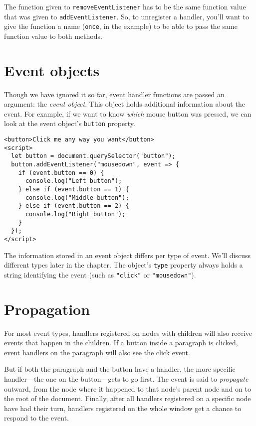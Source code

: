 The function given to \lstinline`removeEventListener` has to be the same function value that was given to \lstinline`addEventListener`. So, to unregister a handler, you'll want to give the function a name (\lstinline`once`, in the example) to be able to pass the same function value to both methods.

\section{Event objects}

Though we have ignored it so far, event handler functions are passed an argument: the \emph{event object}. This object holds additional information about the event. For example, if we want to know \emph{which} mouse button was pressed, we can look at the event object's \lstinline`button` property.

\begin{lstlisting}
<button>Click me any way you want</button>
<script>
  let button = document.querySelector("button");
  button.addEventListener("mousedown", event => {
    if (event.button == 0) {
      console.log("Left button");
    } else if (event.button == 1) {
      console.log("Middle button");
    } else if (event.button == 2) {
      console.log("Right button");
    }
  });
</script>
\end{lstlisting}
\noindent{}

The information stored in an event object differs per type of event. We'll discuss different types later in the chapter. The object's \lstinline`type` property always holds a string identifying the event (such as \lstinline`"click"` or \lstinline`"mousedown"`).

\section{Propagation}

For most event types, handlers registered on nodes with children will also receive events that happen in the children. If a button inside a paragraph is clicked, event handlers on the paragraph will also see the click event.

But if both the paragraph and the button have a handler, the more specific handler—the one on the button—gets to go first. The event is said to \emph{propagate} outward, from the node where it happened to that node's parent node and on to the root of the document. Finally, after all handlers registered on a specific node have had their turn, handlers registered on the whole window get a chance to respond to the event.

